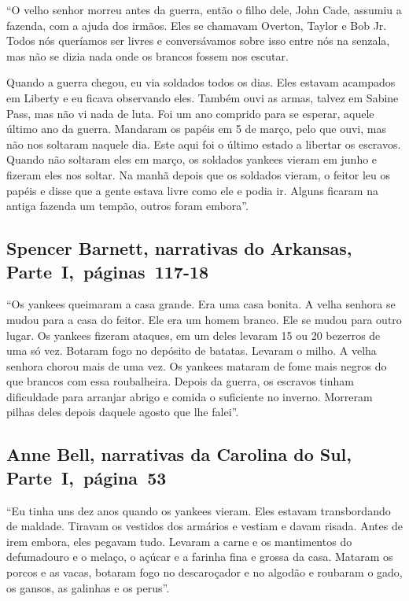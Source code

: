 ``O velho senhor morreu antes da guerra, então o filho dele, John Cade,
assumiu a fazenda, com a ajuda dos irmãos. Eles se chamavam Overton,
Taylor e Bob Jr. Todos nós queríamos ser livres e conversávamos sobre
isso entre nós na senzala, mas não se dizia nada onde os brancos fossem
nos escutar.

Quando a guerra chegou, eu via soldados todos os dias. Eles estavam
acampados em Liberty e eu ficava observando eles. Também ouvi as armas,
talvez em Sabine Pass, mas não vi nada de luta. Foi um ano comprido para
se esperar, aquele último ano da guerra. Mandaram os papéis em 5 de
março, pelo que ouvi, mas não nos soltaram naquele dia. Este aqui foi o
último estado a libertar os escravos. Quando não soltaram eles em março,
os soldados yankees vieram em junho e fizeram eles nos soltar. Na manhã
depois que os soldados vieram, o feitor leu os papéis e disse que a
gente estava livre como ele e podia ir. Alguns ficaram na antiga fazenda
um tempão, outros foram embora''.

\subsection{Spencer Barnett, narrativas do Arkansas, Parte~I,~páginas~117-18} \label{ref19}

``Os yankees queimaram a casa grande. Era uma casa bonita. A velha
senhora se mudou para a casa do feitor. Ele era um homem branco. Ele se
mudou para outro lugar. Os yankees fizeram ataques, em um deles levaram
15 ou 20 bezerros de uma só vez. Botaram fogo no depósito de batatas.
Levaram o milho. A velha senhora chorou mais de uma vez. Os yankees
mataram de fome mais negros do que brancos com essa roubalheira. Depois
da guerra, os escravos tinham dificuldade para arranjar abrigo e comida
o suficiente no inverno. Morreram pilhas deles depois daquele agosto que
lhe falei''.

\subsection{Anne Bell, narrativas da Carolina do Sul, Parte~I,~página~53} \label{ref23}

``Eu tinha uns dez anos quando os yankees vieram. Eles estavam
transbordando de maldade. Tiravam os vestidos dos armários e vestiam e
davam risada. Antes de irem embora, eles pegavam tudo. Levaram a carne e
os mantimentos do defumadouro e o melaço, o açúcar e a farinha fina e
grossa da casa. Mataram os porcos e as vacas, botaram fogo no
descaroçador e no algodão e roubaram o gado, os gansos, as galinhas e os
perus''.

